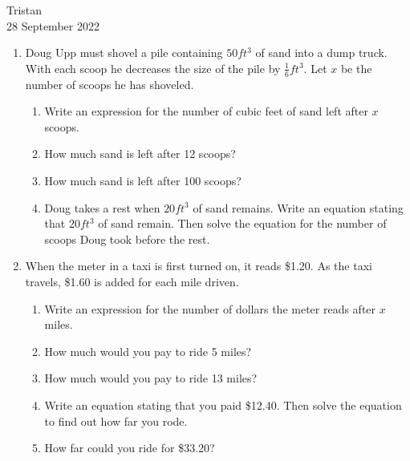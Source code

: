 \documentclass[14pt]{extarticle} %
\begin{document}
\hfill Tristan\\
\null\hfill 28 September 2022

\vspace{10mm}

\begin{enumerate}[label=\Alph*.), itemsep=\fill]
    \item  Doug Upp must shovel a pile containing $50ft^3$ of sand into a dump truck. With each scoop he decreases the size of the pile by $\frac{1}{6}ft^3$. Let $x$ be the number of scoops he has shoveled.
    \begin{enumerate}[itemsep=\fill]
        \item Write an expression for the number of cubic feet of sand left after $x$ scoops.
        \item How much sand is left after 12 scoops?
        \item How much sand is left after 100 scoops?
        \item Doug takes a rest when $20 ft^3$ of sand remains. Write an equation stating that $20 ft^3$ of sand remain. Then solve the equation for the number of scoops Doug took before the rest.
    \end{enumerate}
\vfill\clearpage
    \item  When the meter in a taxi is first turned on, it reads \$1.20. As the taxi travels, \$1.60 is added for each mile driven. 
    \begin{enumerate}[itemsep=\fill]
        \item Write an expression for the number of dollars the meter reads after $x$ miles.
        \item How much would you pay to ride 5 miles?
        \item How much would you pay to ride 13 miles?
        \item Write an equation stating that you paid \$12.40. Then solve the equation to find out how far you rode.
        \item How far could you ride for \$33.20?
    \end{enumerate}
\vfill\end{enumerate}
\end{document}
